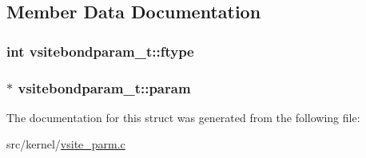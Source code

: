 \subsection{\-Member \-Data \-Documentation}
\hypertarget{structvsitebondparam__t_ad111d520426cb0dd2d7e2ec70115da91}{
\subsubsection[{ftype}]{\setlength{\rightskip}{0pt plus 5cm}int {\bf vsitebondparam\-\_\-t\-::ftype}}}\label{structvsitebondparam__t_ad111d520426cb0dd2d7e2ec70115da91}
\hypertarget{structvsitebondparam__t_a367f28839ed1bb2c2b8fe622a7a87fb7}{
\subsubsection[{param}]{$\ast$ {\bf vsitebondparam\-\_\-t\-::param}}}\label{structvsitebondparam__t_a367f28839ed1bb2c2b8fe622a7a87fb7}


\-The documentation for this struct was generated from the following file\-:\begin{DoxyCompactItemize}
\item 
src/kernel/\hyperlink{vsite__parm_8c}{vsite\-\_\-parm.\-c}\end{DoxyCompactItemize}
